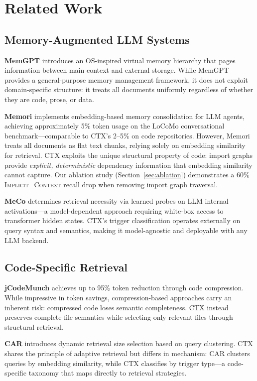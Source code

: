 \documentclass[11pt]{article}
\begin{document}
\section{Related Work}

\subsection{Memory-Augmented LLM Systems}

\textbf{MemGPT} \citep{packer2023memgpt} introduces an OS-inspired virtual memory hierarchy that pages information between main context and external storage. While MemGPT provides a general-purpose memory management framework, it does not exploit domain-specific structure: it treats all documents uniformly regardless of whether they are code, prose, or data.

\textbf{Memori} \citep{memori2025} implements embedding-based memory consolidation for LLM agents, achieving approximately 5\% token usage on the LoCoMo conversational benchmark---comparable to CTX's 2--5\% on code repositories. However, Memori treats all documents as flat text chunks, relying solely on embedding similarity for retrieval. CTX exploits the unique structural property of code: import graphs provide \emph{explicit, deterministic} dependency information that embedding similarity cannot capture. Our ablation study (Section~\ref{sec:ablation}) demonstrates a 60\% \textsc{Implicit\_Context} recall drop when removing import graph traversal.

\textbf{MeCo} \citep{wang2025meco} determines retrieval necessity via learned probes on LLM internal activations---a model-dependent approach requiring white-box access to transformer hidden states. CTX's trigger classification operates externally on query syntax and semantics, making it model-agnostic and deployable with any LLM backend.

\subsection{Code-Specific Retrieval}

\textbf{jCodeMunch} \citep{jcodemunch2025} achieves up to 95\% token reduction through code compression. While impressive in token savings, compression-based approaches carry an inherent risk: compressed code loses semantic completeness. CTX instead preserves complete file semantics while selecting only relevant files through structural retrieval.

\textbf{CAR} \citep{li2024car} introduces dynamic retrieval size selection based on query clustering. CTX shares the principle of adaptive retrieval but differs in mechanism: CAR clusters queries by embedding similarity, while CTX classifies by trigger type---a code-specific taxonomy that maps directly to retrieval strategies.
\end{document}
